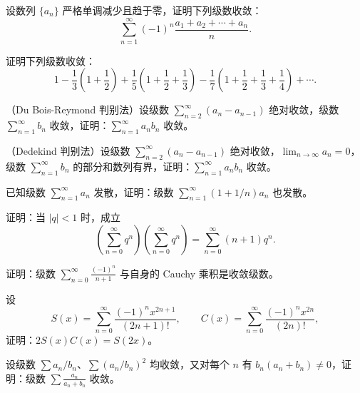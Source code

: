 \begin{xexercise}[6]
设数列 $\{a_n\}$ 严格单调减少且趋于零，证明下列级数收敛：
\[
\sum_{n=1}^{\infty}(-1)^n\frac{a_1+a_2+\cdots+a_n}{n}.
\]
\end{xexercise}

\begin{xexercise}[7]
证明下列级数收敛：
\[
1-\frac13\left(1+\frac12\right)+\frac15\left(1+\frac12+\frac13\right)-\frac17\left(1+\frac12+\frac13+\frac14\right)+\cdots.
\]
\end{xexercise}

\begin{xexercise}[8]
（Du Bois-Reymond 判别法）设级数 $\sum_{n=2}^{\infty}(a_n-a_{n-1})$ 绝对收敛，级数 $\sum_{n=1}^{\infty}b_n$ 收敛，证明：$\sum_{n=1}^{\infty}a_nb_n$ 收敛。
\end{xexercise}

\begin{xexercise}[9]
（Dedekind 判别法）设级数 $\sum_{n=2}^{\infty}(a_n-a_{n-1})$ 绝对收敛，$\lim_{n\to\infty}a_n=0$，级数 $\sum_{n=1}^{\infty}b_n$ 的部分和数列有界，证明：$\sum_{n=1}^{\infty}a_nb_n$ 收敛。
\end{xexercise}

\begin{xexercise}[10]
已知级数 $\sum_{n=1}^{\infty}a_n$ 发散，证明：级数 $\sum_{n=1}^{\infty}(1+1/n)a_n$ 也发散。
\end{xexercise}

\begin{xexercise}[11]
证明：当 $|q|<1$ 时，成立
\[
\left(\sum_{n=0}^{\infty}q^n\right)\left(\sum_{n=0}^{\infty}q^n\right)=\sum_{n=0}^{\infty}(n+1)q^n.
\]
\end{xexercise}

\begin{xexercise}[12]
证明：级数 $\sum_{n=0}^{\infty}\frac{(-1)^n}{n+1}$ 与自身的 Cauchy 乘积是收敛级数。
\end{xexercise}

\begin{xexercise}[13]
设
\[
S(x)=\sum_{n=0}^{\infty}\frac{(-1)^nx^{2n+1}}{(2n+1)!},\qquad C(x)=\sum_{n=0}^{\infty}\frac{(-1)^nx^{2n}}{(2n)!},
\]
证明：$2S(x)C(x)=S(2x)$。
\end{xexercise}

\begin{xexercise}[14]
设级数 $\sum a_n/b_n$、$\sum(a_n/b_n)^2$ 均收敛，又对每个 $n$ 有 $b_n(a_n+b_n)\neq0$，证明：级数 $\sum\frac{a_n}{a_n+b_n}$ 收敛。
\end{xexercise}

